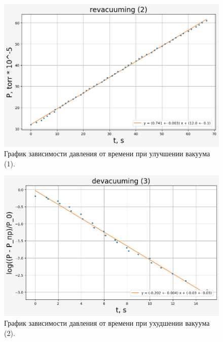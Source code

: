 \documentclass[a4paper,12pt]{article}
\begin{document}
  \begin{figure} [H]
    \centering
    \includegraphics[scale=0.8]{plot2.png}
    \caption{График зависимости давления от времени при улучшении вакуума (1).
  ~\label{plot:first_revacuuming}}
  \end{figure}
  
  \begin{figure} [H]
    \centering
    \includegraphics[scale=0.8]{plot3.png}
    \caption{График зависимости давления от времени при ухудшении вакуума (2).
  ~\label{plot:second_devacuuming}}
  \end{figure}
  
\end{document}

